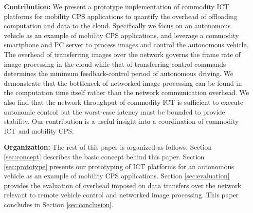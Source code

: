 \textbf{Contribution:}
We present a prototype implementation of commodity ICT platforms for
mobility CPS applications to quantify the overhead of offloading
computation and data to the cloud.
Specifically we focus on an autonomous vehicle as an example of
mobility CPS applications, and leverage a commodity smartphone and
PC server to process images and control the autonomous vehicle.
The overhead of transferring images over the network governs the frame
rate of image processing in the cloud while that of transferring control
commands determines the minimum feedback-control period of autonomous
driving.
We demonstrate that the bottleneck of networked image processing can be
found in the computation time itself rather than the network
communication overhead.
We also find that the network throughput of commodity ICT is sufficient
to execute autonomic control but the worst-case latency must be bounded
to provide stability.
Our contribution is a useful insight into a coordination of commodity
ICT and mobility CPS.

\textbf{Organization:}
The rest of this paper is organized as follows.
Section \ref{sec:concept} describes the basic concept behind this
paper.
Section \ref{sec:prototype} presents our prototyping of ICT platforms
for an autonomous vehicle as an example of mobility CPS applications.
Section \ref{sec:evaluation} provides the evaluation of overhead imposed
on data transfers over the network relevant to remote vehicle control
and networked image processing.
This paper concludes in Section \ref{sec:conclusion}.